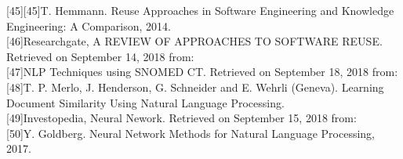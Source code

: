 \documentclass[a4paper]{article}
\begin{document}
[45][45]T. Hemmann. Reuse Approaches in Software Engineering and
Knowledge Engineering: A Comparison, 2014. \\
[46][46]Researchgate, A REVIEW OF APPROACHES TO SOFTWARE REUSE. Retrieved on September 14, 2018 from: \href{https://www.researchgate.net/publication/263926582/download/}\\
[47][47]NLP Techniques using SNOMED CT. Retrieved on September 18, 2018 from: \href{https://confluence.ihtsdotools.org/display/DOCANLYT/5.1+Natural+Language+Processing/}\\
[48][48]T. P. Merlo, J. Henderson, G. Schneider and E. Wehrli (Geneva). Learning Document Similarity
Using Natural Language Processing. \\
[49][49]Investopedia, Neural Nework. Retrieved on September 15, 2018 from: \href{https://www.investopedia.com/terms/n/neuralnetwork.asp}\\
[50][50]Y. Goldberg. Neural Network Methods for Natural Language Processing, 2017. \\
\end{document}
